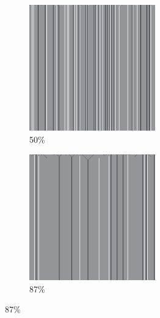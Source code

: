 \documentclass[12pt, fleqn]{report}                             %
\theoremstyle{break}                                            %
\begin{document}
\begin{figure}[ht!]
\begin{subfigure}[b]{0.4\linewidth}
          \includegraphics[width=0.6\textwidth]{Images/77/c.png}
          \caption{50\%}
        \end{subfigure}
        \begin{subfigure}[b]{0.4\linewidth}
          \includegraphics[width=0.6\textwidth]{Images/77/d.png}
          \caption{87\%}
        \end{subfigure}
      \end{figure}
\end{document}
